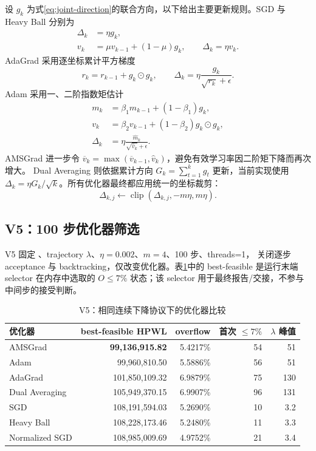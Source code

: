 \documentclass[UTF8,a4paper,11pt]{ctexart}
\DeclareRobustCommand{\code}[1]{\texttt{\detokenize{#1}}}
\newcommand{\clip}{\operatorname{clip}}
\begin{document}
设 $g_k$ 为式\eqref{eq:joint-direction}的联合方向，以下给出主要更新规则。SGD 与 Heavy Ball 分别为
\begin{align}
  \Delta_k&=\eta g_k,\\
  v_k&=\mu v_{k-1}+(1-\mu)g_k,
  \qquad \Delta_k=\eta v_k.
\end{align}
AdaGrad 采用逐坐标累计平方梯度
\begin{equation}
  r_k=r_{k-1}+g_k\odot g_k,
  \qquad
  \Delta_k=\eta\frac{g_k}{\sqrt{r_k}+\epsilon}.
\end{equation}
Adam 采用一、二阶指数矩估计
\begin{align}
  m_k&=\beta_1m_{k-1}+(1-\beta_1)g_k,\\
  v_k&=\beta_2v_{k-1}+(1-\beta_2)g_k\odot g_k,\\
  \Delta_k&=\eta\frac{\widehat m_k}{\sqrt{\widehat v_k}+\epsilon}.
\end{align}
AMSGrad 进一步令 $\overline v_k=\max(\overline v_{k-1},\widehat v_k)$，避免有效学习率因二阶矩下降而再次增大。
Dual Averaging 则依据累计方向 $G_k=\sum_{t=1}^{k}g_t$ 更新，当前实现使用
$\Delta_k=\eta G_k/\sqrt{k}$。所有优化器最终都应用统一的坐标裁剪：
\begin{equation}
  \Delta_{k,j}\leftarrow\clip(\Delta_{k,j},-m\eta,m\eta).
  \label{eq:step-clipping}
\end{equation}

\subsection{V5：100 步优化器筛选}

V5 固定 \code{exact_joint_gp}、trajectory $\lambda$、$\eta=0.002$、$m=4$、100 步、threads=1，
关闭逐步 acceptance 与 backtracking，仅改变优化器。表\ref{tab:v5}中的 best-feasible 是运行末端
selector 在内存中选取的 $O\le7\%$ 状态；该 selector 用于最终报告/交接，不参与中间步的接受判断。

\begin{table}[!htbp]
\centering
\caption{V5：相同连续下降协议下的优化器比较}
\label{tab:v5}
\small
\begin{tabular}{lrrrr}
\toprule
优化器 & best-feasible HPWL & overflow & 首次 $\le7\%$ & $\lambda$ 峰值 \\
\midrule
AMSGrad & \textbf{99,136,915.82} & 5.4217\% & 54 & 51 \\
Adam & 99,960,810.50 & 5.5886\% & 56 & 51 \\
AdaGrad & 101,850,109.32 & 6.9879\% & 75 & 130 \\
Dual Averaging & 105,949,370.15 & 6.9907\% & 96 & 131 \\
SGD & 108,191,594.03 & 5.2690\% & 10 & 3.2 \\
Heavy Ball & 108,228,173.46 & 5.2480\% & 11 & 3.3 \\
Normalized SGD & 108,985,009.69 & 4.9752\% & 21 & 3.4 \\
\bottomrule
\end{tabular}
\end{table}
\end{document}
